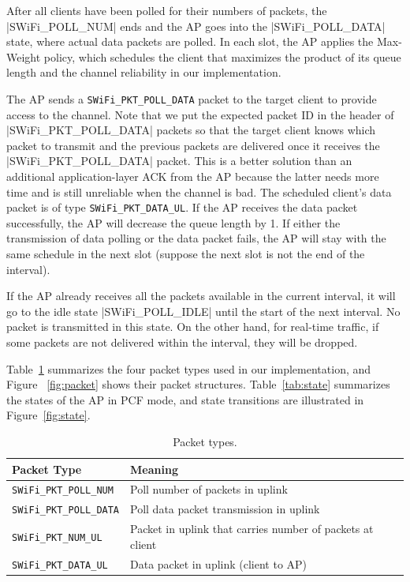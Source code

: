 \documentclass{article}
\begin{document}
After all clients have been polled for their numbers of packets,
the |SWiFi_POLL_NUM| ends and the AP
goes into the |SWiFi_POLL_DATA| state, where actual data packets are polled.
In each slot, the AP applies the Max-Weight policy, which schedules the client
that maximizes the product of its queue length and the channel reliability
in our implementation.

The AP sends a \lstinline|SWiFi_PKT_POLL_DATA| packet to the target client to provide access to the channel.
Note that we put the expected packet ID in the header of |SWiFi_PKT_POLL_DATA| packets
so that the target client knows which packet to transmit and the previous
packets are delivered once it receives the |SWiFi_PKT_POLL_DATA| packet.
This is a better solution than an additional application-layer ACK from  the AP
because the latter needs more time and is still unreliable when the channel is
bad.
The scheduled client's data packet is of type \lstinline|SWiFi_PKT_DATA_UL|.
If the AP receives the data packet successfully, the AP will decrease the queue length by 1. If either the transmission of data polling or the data packet fails, the AP will stay with the same schedule in the next slot (suppose the next slot is not the end of the interval).

If the AP already receives all the packets available in the current interval,
it will go to the idle state |SWiFi_POLL_IDLE| until the start of the next interval.
No packet is transmitted in this state.
On the other hand, for real-time traffic,
if some packets are not delivered within the interval, they will be dropped.

Table~\ref{tab:packet} summarizes the four packet types used in our
implementation, and Figure ~\ref{fig:packet} shows their packet structures.
Table~\ref{tab:state} summarizes the states of the AP in PCF mode,
and state transitions are illustrated in Figure~\ref{fig:state}.

\begin{table}[htbp]
   \centering
   \caption{Packet types.}
   \label{tab:packet}
   \begin{tabular}{| l | l |}
      \hline
      Packet Type  &  Meaning\\ \hline
      \lstinline |SWiFi_PKT_POLL_NUM| & Poll number of packets in uplink\\ \hline 
      \lstinline |SWiFi_PKT_POLL_DATA|  & Poll data packet transmission in uplink\\ \hline 
      \lstinline |SWiFi_PKT_NUM_UL| & Packet in uplink that carries number of packets at client\\ \hline 
      \lstinline |SWiFi_PKT_DATA_UL| & Data packet in uplink (client to AP)\\  
     \hline
   \end{tabular}
\end{table}
 
\end{document}
